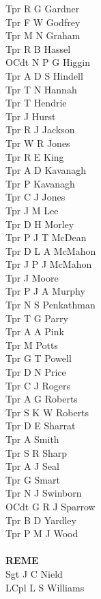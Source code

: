 \begin{multicols}{3}
  Tpr R G Gardner \\
  Tpr F W Godfrey \\
  Tpr M N Graham \\
  Tpr R B Hassel \\
  OCdt N P G Higgin \\
  Tpr A D S Hindell \\
  Tpr T N Hannah \\
  Tpr T Hendrie \\
  Tpr J Hurst \\
  Tpr R J Jackson \\
  Tpr W R Jones \\
  Tpr R E King \\
  Tpr A D Kavanagh \\
  Tpr P Kavanagh \\
  Tpr C J Jones \\
  Tpr J M Lee \\
  Tpr D H Morley \\
  Tpr P J T McDean \\
  Tpr D L A McMahon \\
  Tpr J P J McMahon \\
  Tpr J Moore \\
  Tpr P J A Murphy \\
  Tpr N S Penkathman \\
  Tpr T G Parry \\
  Tpr A A Pink \\
  Tpr M Potts \\
  Tpr G T Powell \\
  Tpr D N Price \\
  Tpr C J Rogers \\
  Tpr A G Roberts \\
  Tpr S K W Roberts \\
  Tpr D E Sharrat \\
  Tpr A Smith \\
  Tpr S R Sharp \\
  Tpr A J Seal \\
  Tpr G Smart \\
  Tpr N J Swinborn \\
  OCdt G R J Sparrow \\
  Tpr B D Yardley \\
  Tpr P M J Wood \\
  \\
  \textbf{REME} \\
  Sgt J C Nield \\
  LCpl L S Williams \\

\end{multicols}
